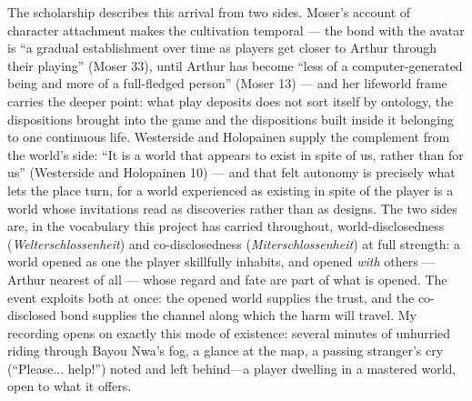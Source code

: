 \documentclass{article}
\begin{document}
The scholarship describes this arrival from two sides. Moser's account of character attachment makes the cultivation temporal — the bond with the avatar is ``a gradual establishment over time as players get closer to Arthur through their playing'' (Moser 33), until Arthur has become ``less of a computer-generated being and more of a full-fledged person'' (Moser 13) — and her lifeworld frame carries the deeper point: what play deposits does not sort itself by ontology, the dispositions brought into the game and the dispositions built inside it belonging to one continuous life. Westerside and Holopainen supply the complement from the world's side: ``It is a world that appears to exist in spite of us, rather than for us'' (Westerside and Holopainen 10) — and that felt autonomy is precisely what lets the place turn, for a world experienced as existing in spite of the player is a world whose invitations read as discoveries rather than as designs. The two sides are, in the vocabulary this project has carried throughout, world-disclosedness (\textit{Welterschlossenheit}) and co-disclosedness (\textit{Miterschlossenheit}) at full strength: a world opened as one the player skillfully inhabits, and opened \textit{with} others — Arthur nearest of all — whose regard and fate are part of what is opened. The event exploits both at once: the opened world supplies the trust, and the co-disclosed bond supplies the channel along which the harm will travel. My recording opens on exactly this mode of existence: several minutes of unhurried riding through Bayou Nwa's fog, a glance at the map, a passing stranger's cry (``Please... help!'') noted and left behind---a player dwelling in a mastered world, open to what it offers.

\end{document}
